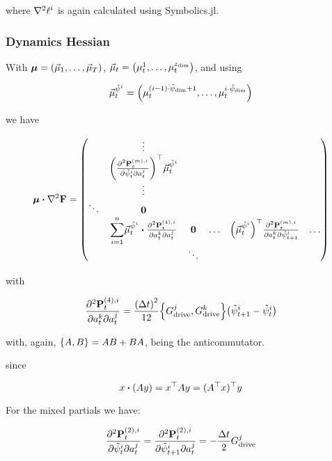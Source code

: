 \documentclass{article}
\newcommand{\isopsi}{\tilde \psi}
\begin{document}
where $\laplacian \ell^i$ is again calculated using \textsf{Symbolics.jl}.

\newpage
\subsubsection*{Dynamics Hessian}

With $\vb*{\mu} = \qty(\vec \mu_1, \dots, \vec \mu_T)$, $\vec\mu_t = \qty(\mu_t^1, \dots, \mu_t^{z_{\text{dim}}})$, and using

\begin{equation*}
\vec\mu_t^{\isopsi^i} = \qty(\mu_t^{(i - 1)\cdot \isopsi_{\dim} + 1}, \dots, \mu_t^{i\cdot\isopsi_{\dim}})
\end{equation*}

we have

\begin{equation}
  \vb*{\mu} \vdot \laplacian \vb{F} = \mqty(
    & \vdots & \\ 
    & \qty(\pdv{\vb{P}_t^{(m), i}}{\isopsi_t^i}{a^j_t})^\top \vec \mu^{\isopsi^i}_t \\
    & \vdots \\
    \ddots & \vb{0}\\
    & \displaystyle{\sum_{i=1}^n} \textstyle{\vec\mu_t^{\isopsi^i} \vdot \pdv{\vb{P}_t^{(4), i}}{a_t^k}{a_t^j}} & \vb{0} & \hdots & \qty(\vec \mu^{\isopsi^i}_t)^\top \pdv{\vb{P}_t^{(m), i}}{a^k_t}{\isopsi_{t+1}^i} & \hdots \\
    & & \ddots \\
  )
\end{equation}

with

\begin{equation}
  \pdv{\vb{P}_t^{(4), i}}{a_t^k}{a_t^j} = \frac{\qty(\Delta t)^2}{12}\qty{G^j_{\text{drive}}, G^k_{\text{drive}}} \qty(\isopsi^i_{t+1} - \isopsi^i_t)
\end{equation}

\hfill

with, again, $\qty{A, B} = AB + BA$, being the anticommutator.

\hfill

since

$$
x \vdot (Ay) = x^\top A y = (A^\top x)^\top y
$$

For the mixed partials we have:

\begin{equation}
  \pdv{\vb{P}_t^{(2), i}}{\isopsi_t^i}{a^j_t} = \pdv{\vb{P}_t^{(2), i}}{\isopsi_{t+1}^i}{a^j_t} = -\frac{\Delta t}{2} G^j_{\text{drive}}
\end{equation}
\end{document}
